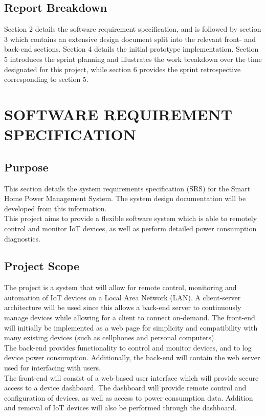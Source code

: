 \documentclass[10pt,twocolumn]{witseiepaper}
\begin{document}
	\subsection{Report Breakdown}
	Section 2 details the software requirement specification, and is followed by section 3 which contains an extensive design document split into the relevant front- and back-end sections. Section 4 details the initial prototype implementation. Section 5 introduces the sprint planning and illustrates the work breakdown over the time designated for this project, while section 6 provides the sprint retrospective corresponding to section 5. 
	\section{SOFTWARE REQUIREMENT SPECIFICATION}
	
	\subsection{Purpose}
	This section details the system requirements specification (SRS) for the Smart Home Power Management System. The system design documentation will be developed from this information.\\
	
	This project aims to provide a flexible software system which is able to remotely control and monitor IoT devices, as well as perform detailed power consumption diagnostics.
	
	\subsection{Project Scope}
	The project is a system that will allow for remote control, monitoring and automation of IoT devices on a Local Area Network (LAN). A client-server architecture will be used since this allows a back-end server to continuously manage devices while allowing for a client to connect on-demand. The front-end will initially be implemented as a web page for simplicity and compatibility with many existing devices (such as cellphones and personal computers). \\
	\newline 
	The back-end provides functionality to control and monitor devices, and to log device power consumption. Additionally, the back-end will contain the web server used for interfacing with users. \\
	\newline
	The front-end will consist of a web-based user interface which will provide secure access to a device dashboard. The dashboard will provide remote control and configuration of devices, as well as access to power consumption data. Addition and removal of IoT devices will also be performed through the dashboard. 
	
\end{document}
